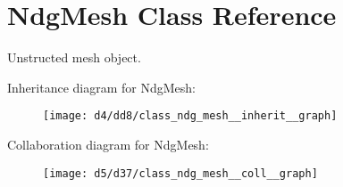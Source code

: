 \hypertarget{class_ndg_mesh}{}\section{Ndg\+Mesh Class Reference}
\label{class_ndg_mesh}


Unstructed mesh object.  




Inheritance diagram for Ndg\+Mesh\+:
\nopagebreak
\begin{figure}[H]
\begin{center}
\leavevmode
\texttt{[image: d4/dd8/class\_ndg\_mesh\_\_inherit\_\_graph]}
\end{center}
\end{figure}


Collaboration diagram for Ndg\+Mesh\+:
\nopagebreak
\begin{figure}[H]
\begin{center}
\leavevmode
\texttt{[image: d5/d37/class\_ndg\_mesh\_\_coll\_\_graph]}
\end{center}
\end{figure}
